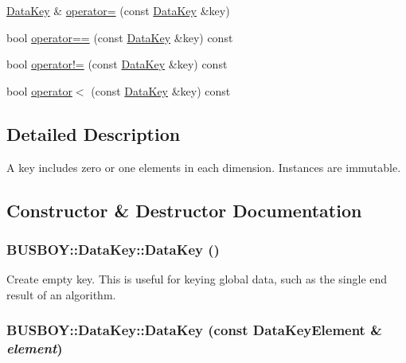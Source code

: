 \begin{DoxyCompactItemize}
\item 
\hyperlink{classBUSBOY_1_1DataKey}{DataKey} \& \hyperlink{classBUSBOY_1_1DataKey_acf89646692118271958f38f418854d1d}{operator=} (const \hyperlink{classBUSBOY_1_1DataKey}{DataKey} \&key)
\item 
bool \hyperlink{classBUSBOY_1_1DataKey_a4697967447ea5edb6455abfe305fdeb4}{operator==} (const \hyperlink{classBUSBOY_1_1DataKey}{DataKey} \&key) const 
\item 
bool \hyperlink{classBUSBOY_1_1DataKey_a82110680c1c78066ba605c40d222e17f}{operator!=} (const \hyperlink{classBUSBOY_1_1DataKey}{DataKey} \&key) const 
\item 
bool \hyperlink{classBUSBOY_1_1DataKey_a5fadf3977a16c0cba0d602e2a184be52}{operator$<$} (const \hyperlink{classBUSBOY_1_1DataKey}{DataKey} \&key) const 
\end{DoxyCompactItemize}


\subsection{Detailed Description}
A key includes zero or one elements in each dimension. Instances are immutable. 

\subsection{Constructor \& Destructor Documentation}
\hypertarget{classBUSBOY_1_1DataKey_af7bf81081ee759a6a1b5da3e5adee371}{
\subsubsection[{DataKey}]{\setlength{\rightskip}{0pt plus 5cm}BUSBOY::DataKey::DataKey ()}}
\label{classBUSBOY_1_1DataKey_af7bf81081ee759a6a1b5da3e5adee371}


Create empty key. This is useful for keying global data, such as the single end result of an algorithm. \hypertarget{classBUSBOY_1_1DataKey_a302a8f510e3875a76c3cf4b4a0a0cab4}{
\subsubsection[{DataKey}]{\setlength{\rightskip}{0pt plus 5cm}BUSBOY::DataKey::DataKey (const {\bf DataKeyElement} \& {\em element})}}
\label{classBUSBOY_1_1DataKey_a302a8f510e3875a76c3cf4b4a0a0cab4}


